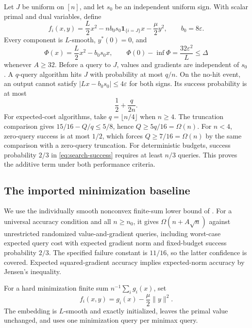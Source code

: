 \documentclass[11pt,letterpaper]{article}
\theoremstyle{definition}
\theoremstyle{remark}
\begin{document}
Let $J$ be uniform on $[n]$, and let $s_0$ be an independent uniform sign.
With scalar primal and dual variables, define
\begin{equation}
 f_i(x,y)=\frac L2x^2-nb_0s_0\mathbf1_{\{i=J\}}x-\frac\mu2y^2,
 \qquad b_0=8\varepsilon.
 \label{eq:search-instance}
\end{equation}
Every component is $L$-smooth, $y^*(0)=0$, and
\[
 \Phi(x)=\frac L2x^2-b_0s_0x,\qquad
 \Phi(0)-\inf\Phi=\frac{32\varepsilon^2}{L}\le\Delta
\]
whenever $A\ge32$. Before a query to $J$, values and gradients are
independent of $s_0$. A $q$-query algorithm hits $J$ with probability at
most $q/n$. On the no-hit event, an output cannot satisfy
$|Lx-b_0s_0|\le4\varepsilon$ for both signs. Its success probability is
at most
\begin{equation}
 \frac12+\frac{q}{2n}.
 \label{eq:search-success}
\end{equation}
For expected-cost algorithms, take $q=\lfloor n/4\rfloor$ when $n\ge4$.
The truncation comparison gives
$15/16-Q/q\le5/8$, hence $Q\ge5q/16=\Omega(n)$.
For $n<4$, zero-query success is at most $1/2$, which forces
$Q\ge7/16=\Omega(n)$ by the same comparison with a zero-query
truncation. For deterministic budgets, success probability $2/3$ in
\eqref{eq:search-success} requires at least $n/3$ queries. This proves the
additive term under both performance criteria.

\subsection{The imported minimization baseline}
\label{sec:minimization-baseline}

We use the individually smooth nonconvex finite-sum lower bound of
\citet[Theorem 3.1 and Appendices F.3 and G.1]{pengdense2026}.
For a universal accuracy condition and all $n\ge n_0$, it gives
$\Omega(n+A\sqrt n)$ against unrestricted randomized value-and-gradient
queries, including worst-case expected query cost with expected gradient
norm and fixed-budget success probability $2/3$.
The specified failure constant is $11/16$, so the latter confidence is
covered. Expected squared-gradient accuracy implies expected-norm accuracy
by Jensen's inequality.

For a hard minimization finite sum $n^{-1}\sum_i g_i(x)$, set
\begin{equation}
 f_i(x,y)=g_i(x)-\frac\mu2\|y\|^2.
 \label{eq:baseline-embedding}
\end{equation}
The embedding is $L$-smooth and exactly initialized, leaves the primal
value unchanged, and uses one minimization query per minimax query.
\end{document}
